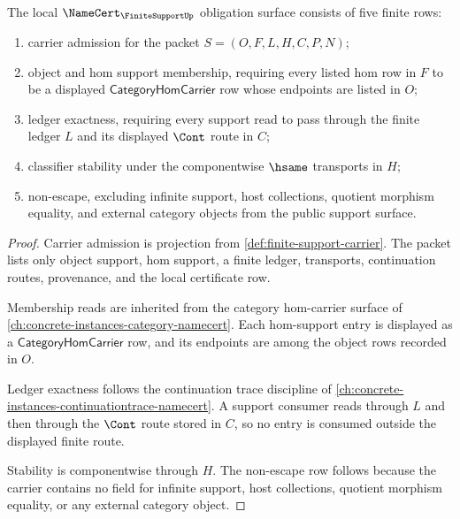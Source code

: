 \begin{theorem}
\label{thm:finite-support-namecert-obligations}
The local $\NameCert_{\FiniteSupportUp}$ obligation surface consists of five finite rows:
\begin{enumerate}
\item carrier admission for the packet $S=(O,F,L,H,C,P,N)$;
\item object and hom support membership, requiring every listed hom row in $F$ to be a displayed $\mathsf{CategoryHomCarrier}$ row whose endpoints are listed in $O$;
\item ledger exactness, requiring every support read to pass through the finite ledger $L$ and its displayed $\Cont$ route in $C$;
\item classifier stability under the componentwise $\hsame$ transports in $H$;
\item non-escape, excluding infinite support, host collections, quotient morphism equality, and external category objects from the public support surface.
\end{enumerate}
\end{theorem}
\begin{proof}
Carrier admission is projection from \autoref{def:finite-support-carrier}. The packet lists only object support, hom support, a finite ledger, transports, continuation routes, provenance, and the local certificate row.

Membership reads are inherited from the category hom-carrier surface of \autoref{ch:concrete-instances-category-namecert}. Each hom-support entry is displayed as a $\mathsf{CategoryHomCarrier}$ row, and its endpoints are among the object rows recorded in $O$.

Ledger exactness follows the continuation trace discipline of \autoref{ch:concrete-instances-continuationtrace-namecert}. A support consumer reads through $L$ and then through the $\Cont$ route stored in $C$, so no entry is consumed outside the displayed finite route.

Stability is componentwise through $H$. The non-escape row follows because the carrier contains no field for infinite support, host collections, quotient morphism equality, or any external category object.
\end{proof}

